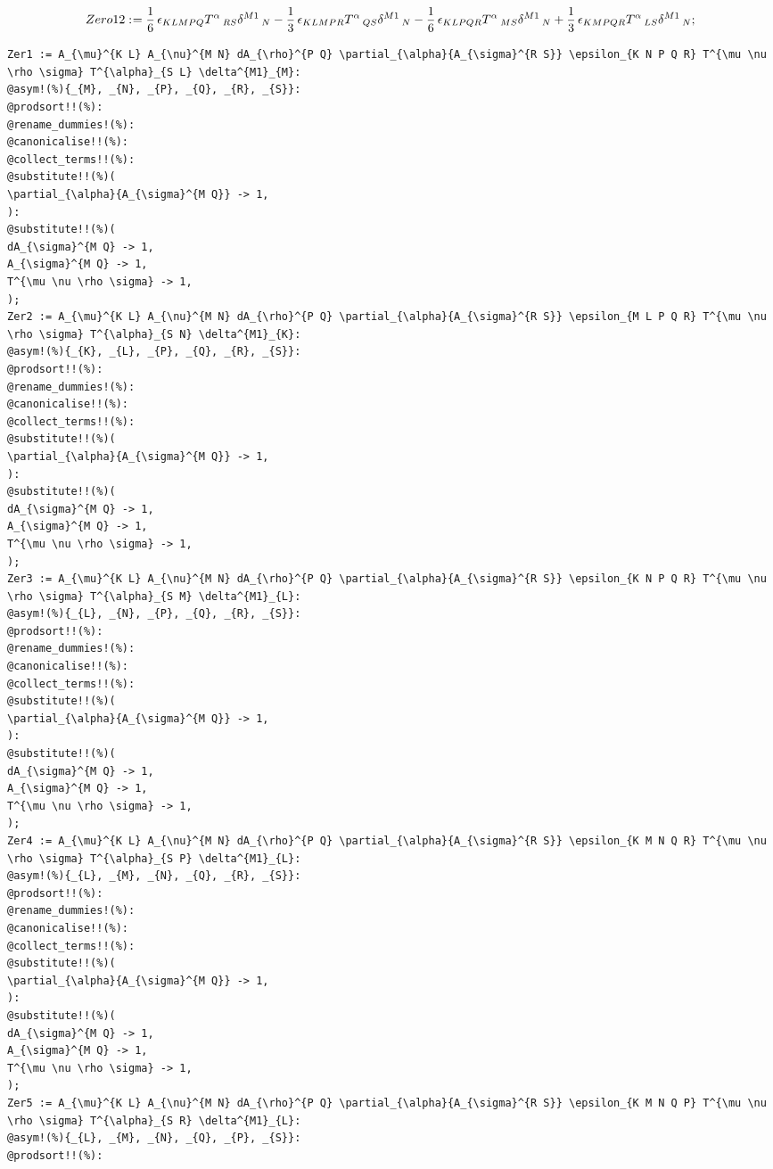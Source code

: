 \documentclass[11pt]{article}
\def\specialcolon{\mathrel{\mathop{:}}\hspace{-.5em}}
\begin{document}
\begin{dmath*}[compact, spread=2pt]
Zero12\specialcolon{}= \frac{1}{6}\, {\epsilon}_{K L M P Q} {T}^{\alpha}\,_{R S} {\delta}^{M1}\,_{N} - \frac{1}{3}\, {\epsilon}_{K L M P R} {T}^{\alpha}\,_{Q S} {\delta}^{M1}\,_{N} - \frac{1}{6}\, {\epsilon}_{K L P Q R} {T}^{\alpha}\,_{M S} {\delta}^{M1}\,_{N} + \frac{1}{3}\, {\epsilon}_{K M P Q R} {T}^{\alpha}\,_{L S} {\delta}^{M1}\,_{N};
\end{dmath*}
{\color[named]{Blue}\begin{verbatim}
Zer1 := A_{\mu}^{K L} A_{\nu}^{M N} dA_{\rho}^{P Q} \partial_{\alpha}{A_{\sigma}^{R S}} \epsilon_{K N P Q R} T^{\mu \nu \rho \sigma} T^{\alpha}_{S L} \delta^{M1}_{M}:
@asym!(%){_{M}, _{N}, _{P}, _{Q}, _{R}, _{S}}:
@prodsort!!(%):
@rename_dummies!(%):
@canonicalise!!(%):
@collect_terms!!(%):
@substitute!!(%)(
\partial_{\alpha}{A_{\sigma}^{M Q}} -> 1,
):
@substitute!!(%)(
dA_{\sigma}^{M Q} -> 1,
A_{\sigma}^{M Q} -> 1,
T^{\mu \nu \rho \sigma} -> 1,
);
Zer2 := A_{\mu}^{K L} A_{\nu}^{M N} dA_{\rho}^{P Q} \partial_{\alpha}{A_{\sigma}^{R S}} \epsilon_{M L P Q R} T^{\mu \nu \rho \sigma} T^{\alpha}_{S N} \delta^{M1}_{K}:
@asym!(%){_{K}, _{L}, _{P}, _{Q}, _{R}, _{S}}:
@prodsort!!(%):
@rename_dummies!(%):
@canonicalise!!(%):
@collect_terms!!(%):
@substitute!!(%)(
\partial_{\alpha}{A_{\sigma}^{M Q}} -> 1,
):
@substitute!!(%)(
dA_{\sigma}^{M Q} -> 1,
A_{\sigma}^{M Q} -> 1,
T^{\mu \nu \rho \sigma} -> 1,
);
Zer3 := A_{\mu}^{K L} A_{\nu}^{M N} dA_{\rho}^{P Q} \partial_{\alpha}{A_{\sigma}^{R S}} \epsilon_{K N P Q R} T^{\mu \nu \rho \sigma} T^{\alpha}_{S M} \delta^{M1}_{L}:
@asym!(%){_{L}, _{N}, _{P}, _{Q}, _{R}, _{S}}:
@prodsort!!(%):
@rename_dummies!(%):
@canonicalise!!(%):
@collect_terms!!(%):
@substitute!!(%)(
\partial_{\alpha}{A_{\sigma}^{M Q}} -> 1,
):
@substitute!!(%)(
dA_{\sigma}^{M Q} -> 1,
A_{\sigma}^{M Q} -> 1,
T^{\mu \nu \rho \sigma} -> 1,
);
Zer4 := A_{\mu}^{K L} A_{\nu}^{M N} dA_{\rho}^{P Q} \partial_{\alpha}{A_{\sigma}^{R S}} \epsilon_{K M N Q R} T^{\mu \nu \rho \sigma} T^{\alpha}_{S P} \delta^{M1}_{L}:
@asym!(%){_{L}, _{M}, _{N}, _{Q}, _{R}, _{S}}:
@prodsort!!(%):
@rename_dummies!(%):
@canonicalise!!(%):
@collect_terms!!(%):
@substitute!!(%)(
\partial_{\alpha}{A_{\sigma}^{M Q}} -> 1,
):
@substitute!!(%)(
dA_{\sigma}^{M Q} -> 1,
A_{\sigma}^{M Q} -> 1,
T^{\mu \nu \rho \sigma} -> 1,
);
Zer5 := A_{\mu}^{K L} A_{\nu}^{M N} dA_{\rho}^{P Q} \partial_{\alpha}{A_{\sigma}^{R S}} \epsilon_{K M N Q P} T^{\mu \nu \rho \sigma} T^{\alpha}_{S R} \delta^{M1}_{L}:
@asym!(%){_{L}, _{M}, _{N}, _{Q}, _{P}, _{S}}:
@prodsort!!(%):

\end{verbatim}}
\end{document}
